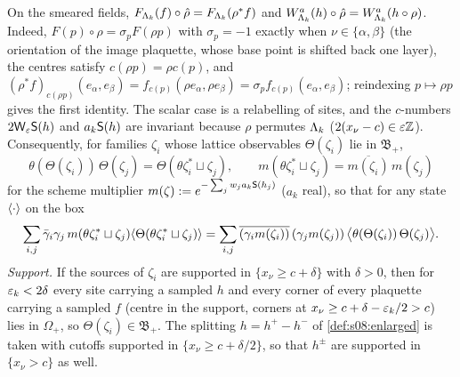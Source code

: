 On the smeared fields, $F_{\Lambda_k}(f)\circ\hat\rho=F_{\Lambda_k}(\rho^*f)$ and $W^a_{\Lambda_k}(h)\circ\hat\rho=W^a_{\Lambda_k}(h\circ\rho)$. Indeed, $F(p)\circ\hat\rho=\sigma_pF(\rho p)$ with $\sigma_p=-1$ exactly when $\nu\in\{\alpha,\beta\}$ (the orientation of the image plaquette, whose base point is shifted back one layer), the centres satisfy $c(\rho p)=\rho c(p)$, and $(\rho^*f)_{c(\rho p)}(e_\alpha,e_\beta)=f_{c(p)}(\rho e_\alpha,\rho e_\beta)=\sigma_pf_{c(p)}(e_\alpha,e_\beta)$; reindexing $p\mapsto\rho p$ gives the first identity. The scalar case is a relabelling of sites, and the $c$-numbers $2\mathsf W_{\varepsilon}\mathsf S(h)$ and $a_k\mathsf S(h)$ are invariant because $\rho$ permutes $\Lambda_k$ ($2(x_\nu-c)\in\varepsilon\mathbb Z$). Consequently, for families $\zeta_i$ whose lattice observables $\Theta(\zeta_i)$ lie in $\mathfrak B_+$,
\begin{equation}\label{eq:s07:thetaTheta}
\theta(\Theta(\zeta_i))\,\Theta(\zeta_j)=\Theta(\theta\zeta_i^*\sqcup\zeta_j),\qquad m(\theta\zeta_i^*\sqcup\zeta_j)=\overline{m(\zeta_i)}\,m(\zeta_j)
\end{equation}
for the scheme multiplier $m(\zeta):= e^{-\sum_jw_ja_k\mathsf S(h_j)}$ ($a_k$ real), so that for any state $\langle \cdot\rangle$ on the box
\begin{equation}\label{eq:s07:matrix}
\sum_{i,j}\bar\gamma_i\gamma_j\,m(\theta\zeta_i^*\sqcup\zeta_j)\langle \Theta(\theta\zeta_i^*\sqcup\zeta_j)\rangle=\sum_{i,j}\overline{(\gamma_im(\zeta_i))}\,(\gamma_jm(\zeta_j))\,\big\langle\theta(\Theta(\zeta_i))\,\Theta(\zeta_j)\big\rangle .
\end{equation}
\emph{Support.} If the sources of $\zeta_i$ are supported in $\{x_\nu\ge c+\delta\}$ with $\delta>0$, then for $\varepsilon_k<2\delta$ every site carrying a sampled $h$ and every corner of every plaquette carrying a sampled $f$ (centre in the support, corners at $x_\nu\ge c+\delta-\varepsilon_k/2>c$) lies in $\Omega_+$, so $\Theta(\zeta_i)\in\mathfrak B_+$. The splitting $h=h^+-h^-$ of \cref{def:s08:enlarged} is taken with cutoffs supported in $\{x_\nu\ge c+\delta/2\}$, so that $h^\pm$ are supported in $\{x_\nu>c\}$ as well.

